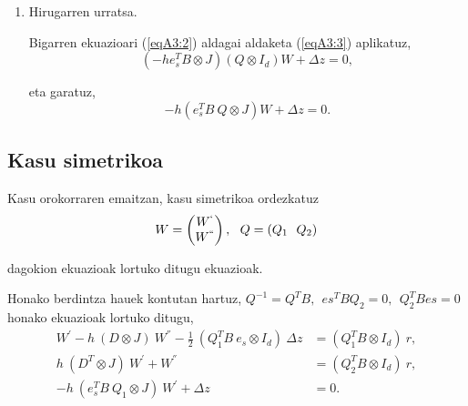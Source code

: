 \begin{enumerate}
\item Hirugarren urratsa.

Bigarren ekuazioari (\ref{eqA3:2}) aldagai aldaketa (\ref{eqA3:3}) aplikatuz,
\begin{equation*}
(- h e_s^T B \otimes J) (Q \otimes I_d) W + \Delta z =0, 
\end{equation*}

eta garatuz,
\begin{equation*}
- h (e_s^T 
B \ Q \otimes J) W +\Delta z =0.
\end{equation*}

\end{enumerate}

\subsection*{Kasu simetrikoa}
\label{serans:B32}

Kasu orokorraren emaitzan, kasu simetrikoa ordezkatuz 
\begin{align*}
W=\left(
\begin{matrix}
W^{`} \\
W^{``} 
\end{matrix}
\right), \ \ Q=(Q_1 \ \ Q_2)
\end{align*}

dagokion ekuazioak lortuko ditugu ekuazioak.

Honako berdintza hauek kontutan hartuz, $Q^{-1}=Q^TB, \ \ es^TBQ_2=0, \ \ Q_2^TBes=0$ honako ekuazioak lortuko ditugu,
\begin{align*}
 W^{'}-h \ (D \otimes J) \ W^{''} -\frac{1}{2}\ (Q_1^T B \ e_s \otimes I_d) \ \Delta z &= (Q_1^T B \otimes I_d) \ r,\\
 h \ (D^T \otimes J) \ W^{'}+W^{''} &= (Q_2^T B \otimes I_d) \ r, \\
  - h \ (e_s^T B \ Q_1 \otimes J) \ W^{'} + \Delta z &=0. 
\end{align*}

